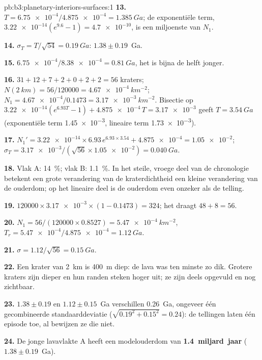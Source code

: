 \begin{solution}{pb:b3:planetary-interiors-surfaces:1}
\textbf{13.} $T = \num{6.75e-4}/\num{4.875e-4} = \qty{1.385}{Ga}$; de
exponentiële term, $\num{3.22e-14}(e^{9.6} - 1) = \num{4.7e-10}$, is een
miljoenste van $N_1$.

\textbf{14.} $\sigma_T = T/\sqrt{54} = \qty{0.19}{Ga}$: $1.38 \pm 0.19$~Ga.

\textbf{15.} $\num{6.75e-4}/\num{8.38e-4} = \qty{0.81}{Ga}$, het is
bijna de helft jonger.

\textbf{16.} $31 + 12 + 7 + 2 + 0 + 2 + 2 = 56$ kraters; $N(\qty{2}{km}) =
56/120000 = \qty{4.67e-4}{km^{-2}}$; $N_1 = \num{4.67e-4}/0.1473 =
\qty{3.17e-3}{km^{-2}}$. Bisectie op $\num{3.22e-14}(e^{6.93T} - 1) +
\num{4.875e-4}\,T = \num{3.17e-3}$ geeft $T = \qty{3.54}{Ga}$ (exponentiële
term \num{1.45e-3}, lineaire term \num{1.73e-3}).

\textbf{17.} $N_1' = \num{3.22e-14}\times6.93\,e^{6.93\times3.54} +
\num{4.875e-4} = \num{1.05e-2}$; $\sigma_T = \num{3.17e-3}/(\sqrt{56}\times
\num{1.05e-2}) = \qty{0.040}{Ga}$.

\textbf{18.} Vlak A: \qty{14}{\percent}; vlak B: \qty{1.1}{\percent}. In
het steile, vroege deel van de chronologie betekent een grote verandering van
de kraterdichtheid een kleine verandering van de ouderdom; op het lineaire
deel is de ouderdom even onzeker als de telling.

\textbf{19.} $120000\times\num{3.17e-3}\times(1 - 0.1473) = 324$; het
draagt $48 + 8 = 56$.

\textbf{20.} $N_1 = 56/(120000\times0.8527) = \qty{5.47e-4}{km^{-2}}$,
$T_r = \num{5.47e-4}/\num{4.875e-4} = \qty{1.12}{Ga}$.

\textbf{21.} $\sigma = 1.12/\sqrt{56} = \qty{0.15}{Ga}$.

\textbf{22.} Een krater van \qty{2}{km} is \qty{400}{m} diep: de lava was
ten minste zo dik. Grotere kraters zijn dieper en hun randen steken hoger
uit; ze zijn deels opgevuld en nog zichtbaar.

\textbf{23.} $1.38 \pm 0.19$ en $1.12 \pm 0.15$~Ga verschillen \qty{0.26}{Ga},
ongeveer één gecombineerde standaarddeviatie ($\sqrt{0.19^2 + 0.15^2} = 0.24$):
de tellingen laten één episode toe, al bewijzen ze die niet.

\textbf{24.} De jonge lavavlakte A heeft een modelouderdom van
\textbf{1.4~miljard~jaar} ($1.38 \pm 0.19$~Ga).
\end{solution}
